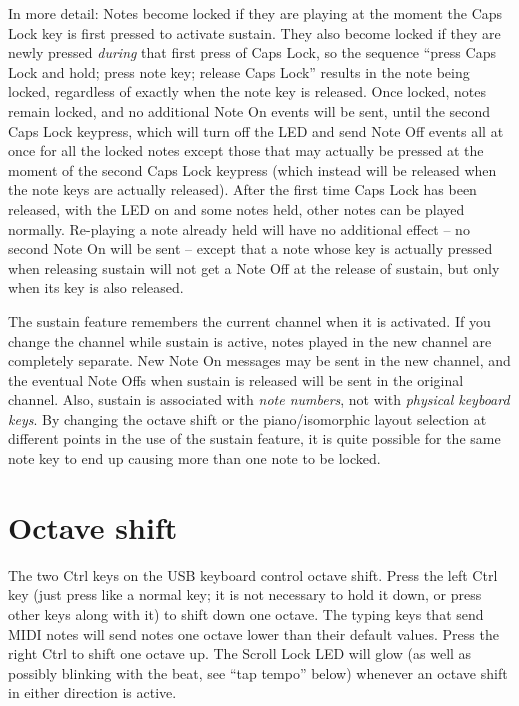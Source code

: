 In more detail:  Notes become locked if they are playing at the moment the
Caps Lock key is first pressed to activate sustain.  They also become locked
if they are newly pressed \emph{during} that first press of Caps Lock, so
the sequence ``press Caps Lock and hold; press note key; release Caps Lock''
results in the note being locked, regardless of exactly when the note key is
released.  Once locked, notes remain locked, and no additional Note On
events will be sent, until the second Caps Lock keypress, which will turn
off the LED and send Note Off events all at once for all the locked notes
except those that may actually be pressed at the moment of the second Caps
Lock keypress (which instead will be released when the note keys are
actually released).  After the first time Caps Lock has been released, with
the LED on and some notes held, other notes can be played normally. 
Re-playing a note already held will have no additional effect -- no second
Note On will be sent -- except that a note whose key is actually pressed
when releasing sustain will not get a Note Off at the release of sustain,
but only when its key is also released.

The sustain feature remembers the current channel when it is activated.  If
you change the channel while sustain is active, notes played in the new
channel are completely separate.  New Note On messages may be sent in the
new channel, and the eventual Note Offs when sustain is released will be
sent in the original channel.  Also, sustain is associated with \emph{note
numbers}, not with \emph{physical keyboard keys}.  By changing the octave
shift or the piano/isomorphic layout selection at different points in the
use of the sustain feature, it is quite possible for the same note key to
end up causing more than one note to be locked.


\section{Octave shift}

The two Ctrl keys on the USB keyboard control octave shift.  Press the left
Ctrl key (just press like a normal key; it is not necessary to hold it down,
or press other keys along with it) to shift down one octave.  The typing
keys that send MIDI notes will send notes one octave lower than their
default values.  Press the right Ctrl to shift one octave up.  The Scroll
Lock LED will glow (as well as possibly blinking with the beat, see ``tap
tempo'' below) whenever an octave shift in either direction is active.

